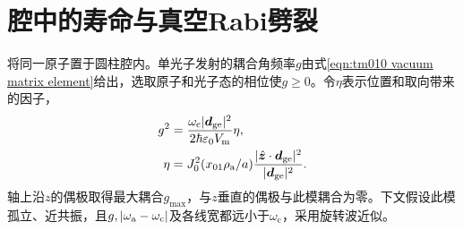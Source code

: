 \section{腔中的寿命与真空Rabi劈裂}
\label{sec:purcell and vacuum rabi}

将同一原子置于圆柱腔内。单光子发射的耦合角频率$g$由式\eqref{eqn:tm010 vacuum matrix element}给出，选取原子和光子态的相位使$g \ge 0$。令$\eta$表示位置和取向带来的因子，
\begin{subequations}
    \begin{align}
        g^2 &= \frac{\omega_{\mathrm{c}}\lvert\bm d_{\mathrm{g}\mathrm{e}}\rvert^2}{2\hbar\varepsilon_0 V_{\mathrm m}}\eta, \label{eqn:local cavity coupling}\\
        \eta &= J_0^2(x_{01}\rho_{\mathrm{a}}/a)
            \frac{\lvert\mathop{}\!\hat{\bm{z}} \cdot \bm d_{\mathrm{g}\mathrm{e}}\rvert^2}{\lvert\bm d_{\mathrm{g}\mathrm{e}}\rvert^2}.
    \end{align}
\end{subequations}
轴上沿$z$的偶极取得最大耦合$g_{\max}$，与$z$垂直的偶极与此模耦合为零。下文假设此模孤立、近共振，且$g,\lvert\omega_{\mathrm{a}} - \omega_{\mathrm{c}}\rvert$及各线宽都远小于$\omega_{\mathrm{c}}$，采用旋转波近似。


